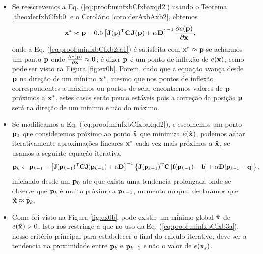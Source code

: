 \begin{myproofT}
\begin{itemize}
\item Se reescrevemos a Eq. (\ref{eq:proof:minfxbCfxbaxqd2}) usando o Teorema \ref{theo:derfxbCfxb0}
e o Corolário \ref{coro:derAxbAxb2},
obtemos
\begin{equation}\label{eq:proof:minfxbCfxb2ea1}
\VECTOR{x}^* \approx \VECTOR{p} -
0.5 \left[ \MATRIX{J}(\VECTOR{p})^{\transpose}\MATRIX{C} \MATRIX{J}(\VECTOR{p})+\alpha \MATRIX{D} \right]^{-1}
\frac{\partial e(\VECTOR{p})}{\partial \VECTOR{x} },
\end{equation}
onde a Eq. (\ref{eq:proof:minfxbCfxb2ea1}) é satisfeita 
com $\VECTOR{x}^* \approx \VECTOR{p}$
se acharmos um  ponto $\VECTOR{p}$ onde  
$\frac{\partial e(\VECTOR{p})}{\partial \VECTOR{x} }\approx \VECTOR{0}$; 
é dizer $\VECTOR{p}$ é um ponto de inflexão de $e(\VECTOR{x})$, como pode ser visto na Figura \ref{fig:ex0b}.
Porem, dado que a equação avança desde $\VECTOR{p}$ na direção de um mínimo $\VECTOR{x}^*$, 
mesmo que nos pontos de inflexão correspondentes a máximos ou pontos de sela,
encontremos valores de $\VECTOR{p}$ próximos a $\VECTOR{x}^*$,
 estes casos serão pouco estáveis pois
a correção da posição $\VECTOR{p}$ será na direção de um mínimo e não do máximo.

\item Se modificamos a Eq. (\ref{eq:proof:minfxbCfxbaxqd2}), e escolhemos um ponto  
$\VECTOR{p}_0$ que consideremos próximo ao ponto $\VECTOR{\hat{x}}$ que minimiza $e(\VECTOR{\hat{x}})$,
podemos achar iterativamente aproximações lineares $\VECTOR{x}^*$ cada vez mais próximos a  $\VECTOR{\hat{x}}$,
se usamos a seguinte equação iterativa,
\begin{equation}\label{eq:proof:minfxbCfxb3a}
\VECTOR{p}_{k} \leftarrow \VECTOR{p}_{k-1} -
\left[ \MATRIX{J}(\VECTOR{p}_{k-1})^{\transpose}\MATRIX{C} \MATRIX{J}(\VECTOR{p}_{k-1}) +\alpha \MATRIX{D}\right]^{-1}
\left\{ \MATRIX{J}(\VECTOR{p}_{k-1})^{\transpose}\MATRIX{C} \left[\VECTOR{f}(\VECTOR{p}_{k-1})-\VECTOR{b}\right]+
\alpha\MATRIX{D}[\VECTOR{p}_{k-1}-\VECTOR{q}]\right\},
\end{equation}
iniciando desde um $\VECTOR{p}_{0}$ 
ate que exista uma tendencia prolongada onde se observe que $\VECTOR{p}_{k}$ é muito próximo a $\VECTOR{p}_{k-1}$,
momento no qual declaramos que $\VECTOR{\hat{x}} \approx \VECTOR{p}_{k}$.
\item Como foi visto na Figura  \ref{fig:ex0b},
pode existir um mínimo global $\VECTOR{\hat{x}}$ de $e(\VECTOR{\hat{x}}) > 0$.
Isto nos restringe a que no uso da Eq. (\ref{eq:proof:minfxbCfxb3a}),
nosso critério principal para estabelecer o final do calculo iterativo,
deve ser a tendencia na  proximidade entre $\VECTOR{p}_{k}$ e $\VECTOR{p}_{k-1}$ 
e não o valor de $e(\VECTOR{x}_k)$.
\end{itemize}~


\end{myproofT}
